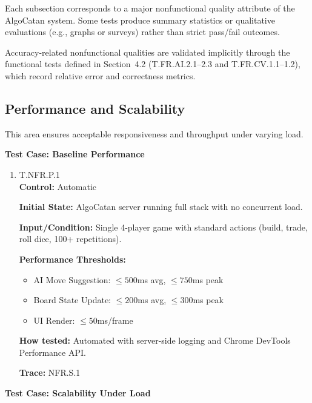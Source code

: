 \documentclass[12pt, titlepage]{article}
\begin{document}
Each subsection corresponds to a major nonfunctional quality attribute of the AlgoCatan system. Some tests produce summary statistics or qualitative evaluations (e.g., graphs or surveys) rather than strict pass/fail outcomes.

Accuracy-related nonfunctional qualities are validated implicitly through the functional tests defined in Section~4.2 (T.FR.AI.2.1--2.3 and T.FR.CV.1.1--1.2), which record relative error and correctness metrics.

\subsection{Performance and Scalability}

This area ensures acceptable responsiveness and throughput under varying load.

\textbf{Test Case: Baseline Performance}

\begin{enumerate}
\item{\hypertarget{T.NFR.P.1}{T.NFR.P.1}\\}
\textbf{Control:} Automatic

\textbf{Initial State:} AlgoCatan server running full stack with no concurrent load.

\textbf{Input/Condition:} Single 4-player game with standard actions (build, trade, roll dice, 100+ repetitions).

\textbf{Performance Thresholds:}
\begin{itemize}
    \item AI Move Suggestion: $\leq 500$ms avg, $\leq 750$ms peak
    \item Board State Update: $\leq 200$ms avg, $\leq 300$ms peak
    \item UI Render: $\leq 50$ms/frame
\end{itemize}

\textbf{How tested:} Automated with server-side logging and Chrome DevTools Performance API.

\textbf{Trace:} NFR.S.1
\end{enumerate}

\textbf{Test Case: Scalability Under Load}
\end{document}
